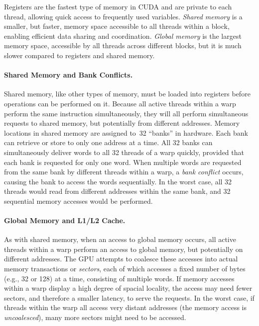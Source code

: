 Registers are the fastest type of memory in CUDA and are private to each thread, allowing quick access to frequently used variables. 
%
{\em Shared memory} is a smaller, but faster, memory space accessible to all threads within a block, enabling efficient data sharing and coordination. 
%
{\em Global memory} is the largest memory space, accessible by all threads across different blocks, but it is much slower compared to registers and shared memory.

\paragraph{Shared Memory and Bank Conflicts.}
Shared memory, like other types of memory, must be loaded into registers before operations can be performed on it.
%
Because all active threads within a warp perform the same instruction simultaneously, they will all perform simultaneous requests to shared memory, but potentially from different addresses.
%
Memory locations in shared memory are assigned to~32 ``banks'' in hardware.
%
Each bank can retrieve or store to only one address at a time.
%
All 32 banks can simultaneously deliver words to all 32 threads of a warp quickly, provided that each bank is requested for only one word.
%
When multiple words are requested from the same bank by different threads within a warp, a {\em bank conflict} occurs, causing the bank to access the words sequentially.
%
In the worst case, all 32 threads would read from different addresses within the same bank, and 32 sequential memory accesses would be performed.
%

\paragraph{Global Memory and L1/L2 Cache.}
As with shared memory, when an access to global memory occurs, all active
threads within a warp perform an access to global memory, but potentially on
different addresses.
%
The GPU attempts to coalesce these accesses into actual memory transactions
or {\em sectors},
each of which accesses a fixed number of bytes (e.g., 32 or 128) at a time,
consisting of multiple words.
%
If memory accesses within a warp display a high degree of spacial locality,
the access may need fewer sectors, and therefore a smaller latency, to serve
the requests.
%
In the worst case, if threads within the warp all access very distant
addresses (the memory access is {\em uncoalesced}), many more sectors might
need to be accessed.


